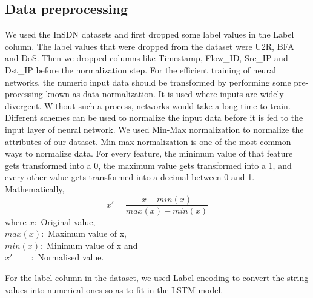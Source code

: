 \subsection{Data preprocessing}
\vspace{-18pt}
We used the InSDN datasets and first dropped some label values in the Label column. The label values that were dropped from the dataset were U2R, BFA and DoS. Then we dropped columns like Timestamp, Flow\_ID, Src\_IP and Dst\_IP before the normalization step. For the efficient training of neural networks, the numeric input data should be transformed by performing some pre-processing known as data normalization. It is used where inputs are widely divergent. Without such a process, networks would take a long time to train. Different schemes can be used to normalize the input data before it is fed to the input layer of neural network. We used Min-Max normalization to normalize the attributes of our dataset. Min-max normalization is one of the most common ways to normalize data. For every feature, the minimum value of that feature gets transformed into a 0, the maximum value gets transformed into a 1, and every other value gets transformed into a decimal between 0 and 1. Mathematically,
\begin{equation}
x' = \frac{x- min(x)}{max(x)-min(x)}
\end{equation}
where $x: $ Original value,\\ $max(x): $ Maximum value of x,\\ $min(x): $ Minimum value of x and \\ 
$x'\;\;\;\;\;\;\;\;:$ Normalised value. \par 
For the label column in the dataset, we used Label encoding to convert the string values into numerical ones so as to fit in the LSTM model. 
